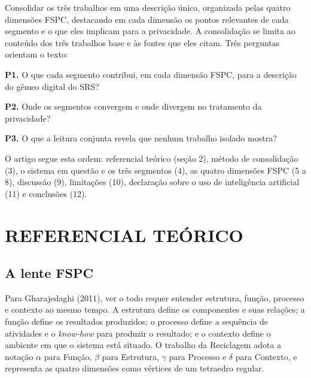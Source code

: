 \documentclass[12pt,a4paper,article,oneside,english,brazil]{abntex2}
\begin{document}
Consolidar os três trabalhos em uma descrição única, organizada pelas quatro dimensões FSPC, destacando em cada dimensão os pontos relevantes de cada segmento e o que eles implicam para a privacidade. A consolidação se limita ao conteúdo dos três trabalhos base e às fontes que eles citam. Três perguntas orientam o texto:

\begin{list}{}{\setlength{\leftmargin}{0.635cm}\setlength{\itemsep}{0pt}\setlength{\topsep}{0pt}}
\item \textbf{P1.} O que cada segmento contribui, em cada dimensão FSPC, para a descrição do gêmeo digital do SRS?
\item \textbf{P2.} Onde os segmentos convergem e onde divergem no tratamento da privacidade?
\item \textbf{P3.} O que a leitura conjunta revela que nenhum trabalho isolado mostra?
\end{list}

O artigo segue esta ordem: referencial teórico (seção 2), método de consolidação (3), o sistema em questão e os três segmentos (4), as quatro dimensões FSPC (5 a 8), discussão (9), limitações (10), declaração sobre o uso de inteligência artificial (11) e conclusões (12).

\section{REFERENCIAL TEÓRICO}

\subsection{A lente FSPC}

Para Gharajedaghi (2011), ver o todo requer entender estrutura, função, processo e contexto ao mesmo tempo. A estrutura define os componentes e suas relações; a função define os resultados produzidos; o processo define a sequência de atividades e o \textit{know-how} para produzir o resultado; e o contexto define o ambiente em que o sistema está situado. O trabalho da Reciclagem adota a notação $\alpha$ para Função, $\beta$ para Estrutura, $\gamma$ para Processo e $\delta$ para Contexto, e representa as quatro dimensões como vértices de um tetraedro regular.
\end{document}
